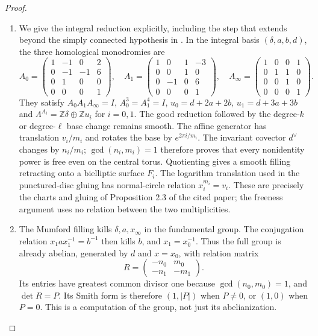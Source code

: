 \begin{proof}
\begin{enumerate}[label=\arabic*.,leftmargin=*]
\item We give the integral reduction explicitly, including the step that
extends beyond the simply connected hypothesis in
\cite[Propositions 4.1, 4.3, 4.5]{manViaclovskyLogs26}.
In the integral basis $(\delta,a,b,d)$, the three homological
monodromies are
\[
 A_0=\begin{pmatrix}1&-1&0&2\\0&-1&-1&6\\0&1&0&0\\0&0&0&1\end{pmatrix},\quad
 A_1=\begin{pmatrix}1&0&1&-3\\0&0&1&0\\0&-1&0&6\\0&0&0&1\end{pmatrix},\quad
 A_\infty=\begin{pmatrix}1&0&0&1\\0&1&1&0\\0&0&1&0\\0&0&0&1\end{pmatrix}.
\]
They satisfy $A_0A_1A_\infty=I$, $A_0^3=A_1^4=I$,
$u_0=d+2a+2b$, $u_1=d+3a+3b$ and
$\Lambda^{A_i}=\mathbb Z\delta\oplus\mathbb Zu_i$ for $i=0,1$.
The good reduction followed by the degree-$k$ or degree-$\ell$
base change remains smooth. The affine generator has translation
$v_i/m_i$ and rotates the base by $e^{2\pi i/m_i}$.
The invariant covector $d^\vee$ changes by $n_i/m_i$;
$\gcd(n_i,m_i)=1$ therefore proves that every nonidentity power
is free even on the central torus. Quotienting gives a smooth
filling retracting onto a bielliptic surface $F_i$.
The logarithm translation used in the punctured-disc gluing has
normal-circle relation $x_i^{m_i}=v_i$. These are precisely the
charts and gluing of Proposition 2.3 of the cited paper; the
freeness argument uses no relation between the two multiplicities.

\item The Mumford filling kills $\delta,a,x_\infty$ in the fundamental
group. The conjugation relation $x_1ax_1^{-1}=b^{-1}$ then kills
$b$, and $x_1=x_0^{-1}$. Thus the full group is already abelian,
generated by $d$ and $x=x_0$, with relation matrix
\[
 R=\begin{pmatrix}-n_0&m_0\\-n_1&-m_1\end{pmatrix}.
\]
Its entries have greatest common divisor one because
$\gcd(n_0,m_0)=1$, and $\det R=P$. Its Smith form is therefore
$(1,|P|)$ when $P\ne0$, or $(1,0)$ when $P=0$.
This is a computation of the group, not just its abelianization.


\end{enumerate}
\end{proof}
